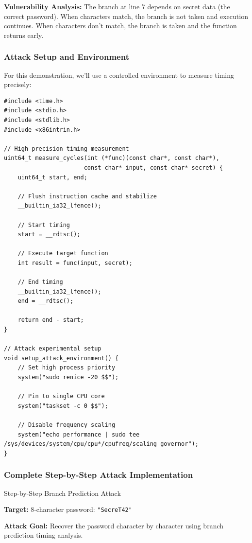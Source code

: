 \documentclass[11pt,a4paper]{article}
\theoremstyle{definition}
\begin{document}
\textbf{Vulnerability Analysis:} The branch at line 7 depends on secret data (the correct password). When characters match, the branch is not taken and execution continues. When characters don't match, the branch is taken and the function returns early.

\subsubsection{Attack Setup and Environment}

For this demonstration, we'll use a controlled environment to measure timing precisely:

\begin{lstlisting}[caption={Attack Setup and Measurement Infrastructure}]
#include <time.h>
#include <stdio.h>
#include <stdlib.h>
#include <x86intrin.h>

// High-precision timing measurement
uint64_t measure_cycles(int (*func)(const char*, const char*), 
                       const char* input, const char* secret) {
    uint64_t start, end;
    
    // Flush instruction cache and stabilize
    __builtin_ia32_lfence();
    
    // Start timing
    start = __rdtsc();
    
    // Execute target function
    int result = func(input, secret);
    
    // End timing
    __builtin_ia32_lfence();
    end = __rdtsc();
    
    return end - start;
}

// Attack experimental setup
void setup_attack_environment() {
    // Set high process priority
    system("sudo renice -20 $$");
    
    // Pin to single CPU core
    system("taskset -c 0 $$");
    
    // Disable frequency scaling
    system("echo performance | sudo tee /sys/devices/system/cpu/cpu*/cpufreq/scaling_governor");
}
\end{lstlisting}

\subsubsection{Complete Step-by-Step Attack Implementation}

\begin{examplebox}{Step-by-Step Branch Prediction Attack}

\textbf{Target:} 8-character password: \texttt{"SecreT42"}

\textbf{Attack Goal:} Recover the password character by character using branch prediction timing analysis.

\end{examplebox}
\end{document}

